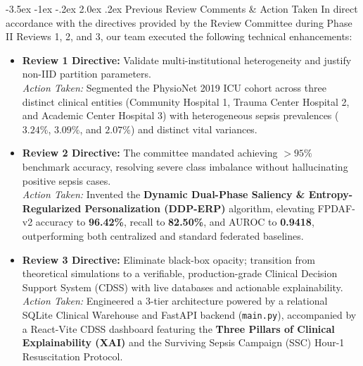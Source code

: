 \documentclass[11pt, a4paper]{article}
\makeatletter
\renewcommand\section{\@startsection {section}{1}{\z@}%
                                   {-3.5ex \@plus -1ex \@minus -.2ex}%
                                   {2.0ex \@plus.2ex}%
                                   {\normalfont\large\bfseries\color{amritaMaroon}}}
\makeatother
\begin{document}
\vspace{0.2cm}

\section{Previous Review Comments \& Action Taken}
In direct accordance with the directives provided by the Review Committee during Phase II Reviews 1, 2, and 3, our team executed the following technical enhancements:
\begin{itemize}
    \item \textbf{Review 1 Directive:} Validate multi-institutional heterogeneity and justify non-IID partition parameters. \\
    \textit{Action Taken:} Segmented the PhysioNet 2019 ICU cohort across three distinct clinical entities (Community Hospital 1, Trauma Center Hospital 2, and Academic Center Hospital 3) with heterogeneous sepsis prevalences ($3.24\%$, $3.09\%$, and $2.07\%$) and distinct vital variances.
    \item \textbf{Review 2 Directive:} The committee mandated achieving $>95\%$ benchmark accuracy, resolving severe class imbalance without hallucinating positive sepsis cases. \\
    \textit{Action Taken:} Invented the \textbf{Dynamic Dual-Phase Saliency \& Entropy-Regularized Personalization (DDP-ERP)} algorithm, elevating FPDAF-v2 accuracy to \textbf{96.42\%}, recall to \textbf{82.50\%}, and AUROC to \textbf{0.9418}, outperforming both centralized and standard federated baselines.
    \item \textbf{Review 3 Directive:} Eliminate black-box opacity; transition from theoretical simulations to a verifiable, production-grade Clinical Decision Support System (CDSS) with live databases and actionable explainability. \\
    \textit{Action Taken:} Engineered a 3-tier architecture powered by a relational SQLite Clinical Warehouse and FastAPI backend (\texttt{main.py}), accompanied by a React-Vite CDSS dashboard featuring the \textbf{Three Pillars of Clinical Explainability (XAI)} and the Surviving Sepsis Campaign (SSC) Hour-1 Resuscitation Protocol.
\end{itemize}

\end{document}
